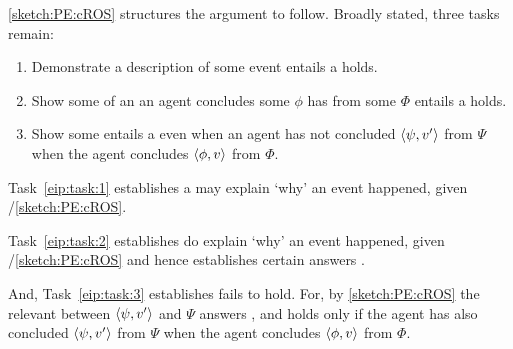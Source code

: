 \begin{note}
  \autoref{sketch:PE:cROS} structures the argument to follow.
  Broadly stated, three tasks remain:

  \begin{enumerate}[label=\arabic*., ref=\arabic*]
  \item
    \label{eip:task:1}
    Demonstrate a description of some event entails a \fingfr{} holds.
  \item
    \label{eip:task:2}
    Show some \se{} of an  an agent concludes some  \(\phi\) has  from some  \(\Phi\) entails a \fingfr{} holds.
  \item
    \label{eip:task:3}
    Show some \se{} entails a  even when an agent has not concluded \(\langle\psi, v'\rangle\) from \(\Psi\) when the agent concludes \(\langle\phi, v\rangle\) from \(\Phi\).
  \end{enumerate}

  Task~\ref{eip:task:1} establishes a  may explain `why' an event happened, given \progExII{}/\autoref{sketch:PE:cROS}.

  Task~\ref{eip:task:2} establishes  do explain `why' an event happened, given \progExII{}/\autoref{sketch:PE:cROS} and hence establishes certain answers \qWhy{}.

  And, Task~\ref{eip:task:3} establishes \issueInclusion{} fails to hold.
  For, by \autoref{sketch:PE:cROS} the relevant \fingfr{} between \(\langle\psi, v'\rangle\) and \(\Psi\) answers \qWhy{}, and \issueInclusion{} holds only if the agent has also concluded \(\langle\psi, v'\rangle\) from \(\Psi\) when the agent concludes \(\langle\phi, v\rangle\) from \(\Phi\).
\end{note}






